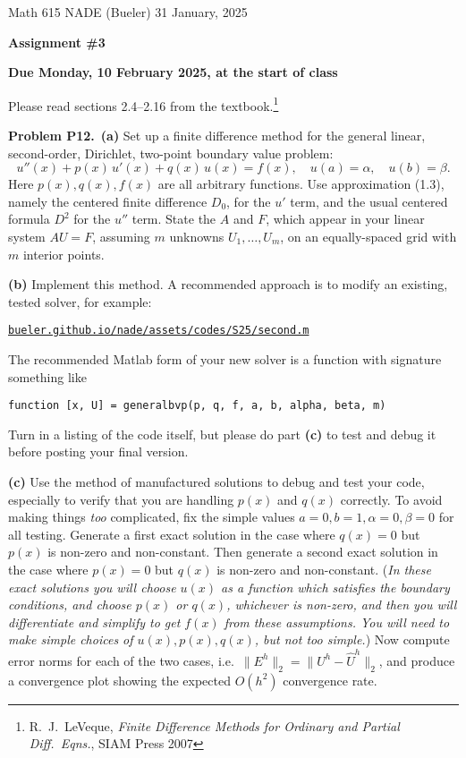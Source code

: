 \documentclass[12pt]{amsart}
\newcommand{\prob}[1]{\bigskip\noindent\textbf{#1}\quad }
\newcommand{\epart}[1]{\medskip\noindent\textbf{(#1)}\quad }
\newcommand{\ppart}[1]{\,\textbf{(#1)}\quad }
\begin{document}
\scriptsize \noindent Math 615 NADE (Bueler) \hfill 31 January, 2025
\normalsize

\medskip\bigskip

\Large\centerline{\textbf{Assignment \#3}}
\large
\bigskip

\centerline{\textbf{Due Monday, 10 February 2025, at the start of class}}
\bigskip
\normalsize

\thispagestyle{empty}

\bigskip
Please read sections 2.4--2.16 from the textbook.\footnote{R.~J.~LeVeque, \emph{Finite Difference Methods for Ordinary and Partial Diff.~Eqns.}, SIAM Press 2007}


\prob{Problem P12.}  \ppart{a}  Set up a finite difference method for the general linear, second-order, Dirichlet, two-point boundary value problem:
\begin{equation}
u''(x) + p(x)\, u'(x) + q(x)\, u(x) = f(x), \quad u(a) = \alpha, \quad u(b) = \beta. \label{genbvp}
\end{equation}
Here $p(x),q(x),f(x)$ are all arbitrary functions.  Use approximation (1.3), namely the centered finite difference $D_0$, for the $u'$ term, and the usual centered formula $D^2$ for the $u''$ term.  State the $A$ and $F$, which appear in your linear system $AU=F$, assuming $m$ unknowns $U_1,\dots,U_m$, on an equally-spaced grid with $m$ interior points.

\epart{b} Implement this method.  A recommended approach is to modify an existing, tested solver, for example:

\centerline{\href{https://bueler.github.io/nade/assets/codes/S25/second.m}{\texttt{bueler.github.io/nade/assets/codes/S25/second.m}}}

\medskip
\noindent The recommended Matlab form of your new solver is a function with signature something like

\smallskip
\small
\centerline{\texttt{function [x, U] = generalbvp(p, q, f, a, b, alpha, beta, m)}}

\normalsize
\medskip
\noindent Turn in a listing of the code itself, but please do part \textbf{(c)} to test and debug it before posting your final version.

\epart{c}  Use the method of manufactured solutions to debug and test your code, especially to verify that you are handling $p(x)$ and $q(x)$ correctly.  To avoid making things \emph{too} complicated, fix the simple values $a=0,b=1,\alpha=0,\beta=0$ for all testing.  Generate a first exact solution in the case where $q(x)=0$ but $p(x)$ is non-zero and non-constant.  Then generate a second exact solution in the case where $p(x)=0$ but $q(x)$ is non-zero and non-constant.  (\emph{In these exact solutions you will \emph{choose} $u(x)$ as a function which satisfies the boundary conditions, and \emph{choose} $p(x)$ or $q(x)$, whichever is non-zero, and then you will differentiate and simplify to get $f(x)$ from these assumptions.  You will need to make simple choices of $u(x),p(x),q(x)$, but not \emph{too} simple.})  Now compute error norms for each of the two cases, i.e.~$\|E^h\|_2=\|U^h-\hat U^h\|_2$, and produce a convergence plot showing the expected $O(h^2)$ convergence rate.
\end{document}
